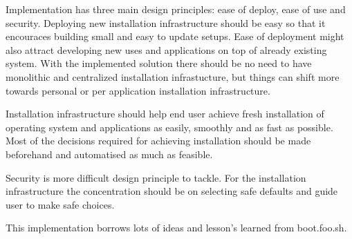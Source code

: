 
Implementation has three main design principles: ease of deploy, ease
of use and security. Deploying new installation infrastructure should
be easy so that it encouraces building small and easy to update
setups. Ease of deployment might also attract developing new uses and
applications on top of already existing system. With the implemented
solution there should be no need to have monolithic and centralized
installation infrastucture, but things can shift more towards personal
or per application installation infrastructure.

Installation infrastructure should help end user achieve fresh
installation of operating system and applications as easily, smoothly
and as fast as possible. Most of the decisions required for achieving
installation should be made beforehand and automatised as much as
feasible.

Security is more difficult design principle to tackle. For the
installation infrastructure the concentration should be on selecting
safe defaults and guide user to make safe choices.

This implementation borrows lots of ideas and lesson's learned from
boot.foo.sh\cite{boot-foo-sh}.
